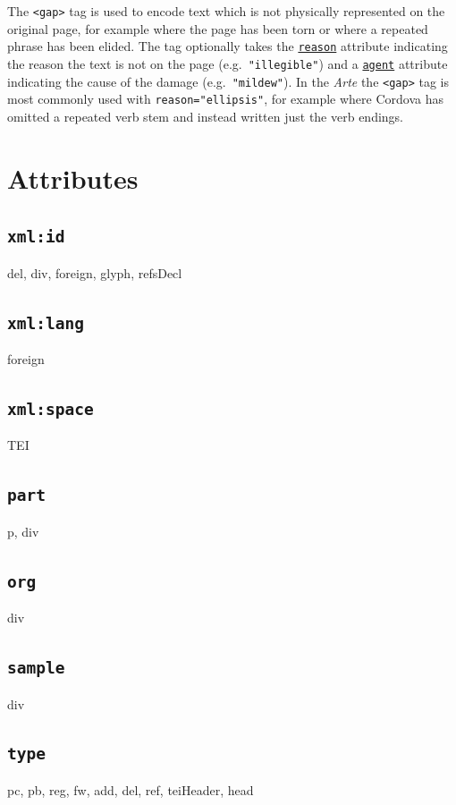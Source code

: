 \documentclass[12pt,a4paper]{article}
\begin{document}
The \texttt{<gap>} tag is used to encode text which is not physically represented on the original page, for example where the page has been torn or where a repeated phrase has been elided.  The tag optionally takes the \hyperref[att-sec:reason]{\texttt{reason}} attribute indicating the reason the text is not on the page (e.g.\ \texttt{"illegible"}) and a \hyperref[att-sec:agent]{\texttt{agent}} attribute indicating the cause of the damage (e.g.\ \texttt{"mildew"}).  In the \emph{Arte} the \texttt{<gap>} tag is most commonly used with \texttt{reason="ellipsis"}, for example where Cordova has omitted a repeated verb stem and instead written just the verb endings.


\section{Attributes}

\subsection{\texttt{xml:id}} \label{att-sec:xml:id}
del, div, foreign, glyph, refsDecl

\subsection{\texttt{xml:lang}} \label{att-sec:xml:lang}
foreign

\subsection{\texttt{xml:space}} \label{att-sec:xml:space}
TEI

\subsection{\texttt{part}} \label{att-sec:part}
p, div

\subsection{\texttt{org}} \label{att-sec:org}
div

\subsection{\texttt{sample}} \label{att-sec:sample}
div

\subsection{\texttt{type}} \label{att-sec:type}
pc, pb, reg, fw, add, del, ref, teiHeader, head
\end{document}
